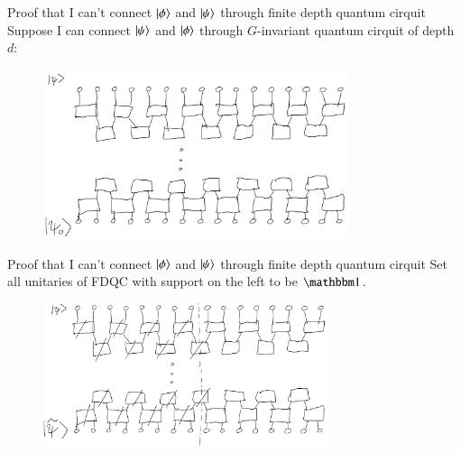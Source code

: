 \documentclass{beamer}
\begin{document}
\begin{frame}{Proof that I can't connect $\ket{\phi}$ and $\ket{\psi}$ through finite depth quantum cirquit}
	Suppose I can connect $\ket{\psi}$ and $\ket{\phi}$ through $G$-invariant quantum cirquit of depth $d$:
	\begin{figure}
		\center
		\includegraphics[width=0.8\textwidth]{Figures/ConnectingPsiAndPsi0Proof.png}
	\end{figure}
\end{frame}

\begin{frame}{Proof that I can't connect $\ket{\phi}$ and $\ket{\psi}$ through finite depth quantum cirquit}
	Set all unitaries of FDQC with support on the left to be $\id$.
	\begin{figure}
		\center
		\includegraphics[width=0.75\textwidth]{Figures/ConnectingPsiAndPsi0Proof2.png}
	\end{figure}
\end{frame}
\end{document}
